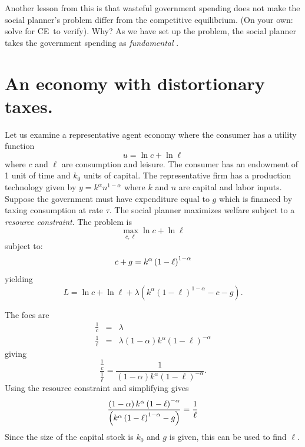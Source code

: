 \documentclass{sebase}
\begin{document}
Another lesson from this is that wasteful government spending does not make
the social planner's problem differ from the competitive equilibrium. (On
your own: solve for CE\ to verify). Why? As we have set up the problem, the
social planner takes the government spending as \textit{fundamental}%
.\pagebreak

\section{An economy with distortionary taxes.\textit{\ }}

Let us examine a representative agent economy where the consumer has a
utility function 
\begin{equation}
u=\ln c+\ln \ell  \label{u2}
\end{equation}%
where $c$ and $\ell $ are consumption and leisure. The consumer has an
endowment of 1 unit of time and $k_{0}$ units of capital. The representative
firm has a production technology given by $y=k^{\alpha }n^{1-\alpha }$ where 
$k$ and $n$ are capital and labor inputs. Suppose the government must have
expenditure equal to $g$ which is financed by taxing consumption at rate $%
\tau $. The social planner maximizes welfare subject to a \textit{resource
constraint}. The problem is 
\begin{equation*}
\underset{c,\ell }{\max }\ln c+\ln \ell
\end{equation*}%
subject to:%
\begin{equation}
c+g=k^{\alpha }\left( 1-\ell \right) ^{1-\alpha }  \notag
\end{equation}%
yielding 
\begin{equation*}
L=\ln c+\ln \ell +\lambda \left( k^{\alpha }\left( 1-\ell \right) ^{1-\alpha
}-c-g\right) .
\end{equation*}%
\pagebreak

The focs are%
\begin{eqnarray*}
\frac{1}{c} &=&\lambda \\
\frac{1}{\ell } &=&\lambda \left( 1-\alpha \right) k^{\alpha }\left( 1-\ell
\right) ^{-\alpha }
\end{eqnarray*}%
giving%
\begin{equation}
\frac{\frac{1}{c}}{\frac{1}{\ell }}=\frac{1}{\left( 1-\alpha \right)
k^{\alpha }\left( 1-\ell \right) ^{-\alpha }}.  \label{spp}
\end{equation}%
Using the resource constraint and simplifying gives 
\begin{equation}
\frac{\left( 1-\alpha \right) k^{\alpha }\left( 1-\ell \right) ^{-\alpha }}{%
\left( k^{\alpha }\left( 1-\ell \right) ^{1-\alpha }-g\right) }=\frac{1}{%
\ell }  \label{6}
\end{equation}%
Since the size of the capital stock is $k_{0}$ and $g$ is given, this can be
used to find $\ell .$\pagebreak
\end{document}
